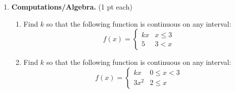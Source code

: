 \documentclass[11pt,letterpaper]{article}
\begin{document}
\begin{enumerate}
\item \textbf{Computations/Algebra.} (1 pt each) 
\begin{enumerate} 
\item Find $k$ so that the following function is continuous on any interval:
\[f(x)=\left\{\begin{array}{ll}
               kx & x\leq 3 \\
               5 & 3<x 
              \end{array}\right.\]
\vspace{3pc}
\item Find $k$ so that the following function is continuous on any interval:
\[f(x)=\left\{\begin{array}{ll}
               kx & 0\leq x< 3 \\
               3x^2 & 2\leq x 
              \end{array}\right.\]
\vspace{3pc}
\end{enumerate}

\end{enumerate}
\end{document}
